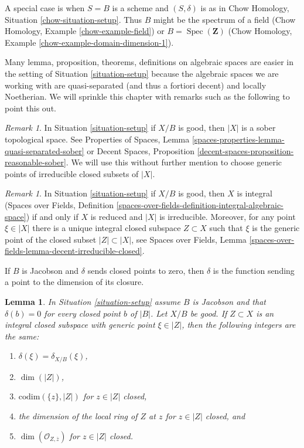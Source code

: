 \documentclass{stacks-project}
\theoremstyle{plain}
\newtheorem{lemma}[subsection]{Lemma}
\theoremstyle{definition}
\theoremstyle{remark}
\newtheorem{remark}[subsection]{Remark}
\numberwithin{equation}{subsection}
\def\Spec{\mathop{\mathrm{Spec}}}
\begin{document}
\noindent
A special case is when $S = B$ is a scheme and $(S, \delta)$ is as in
Chow Homology, Situation \ref{chow-situation-setup}. Thus $B$ might be
the spectrum of a field (Chow Homology, Example \ref{chow-example-field})
or $B = \Spec(\mathbf{Z})$
(Chow Homology, Example \ref{chow-example-domain-dimension-1}).

\medskip\noindent
Many lemma, proposition, theorems, definitions on algebraic spaces
are easier in the setting of Situation \ref{situation-setup} because
the algebraic spaces we are working with are quasi-separated
(and thus a fortiori decent) and locally Noetherian. We will sprinkle
this chapter with remarks such as the following to point this out.

\begin{remark}
\label{remark-sober}
In Situation \ref{situation-setup} if $X/B$ is good, then
$|X|$ is a sober topological space. See
Properties of Spaces, Lemma \ref{spaces-properties-lemma-quasi-separated-sober}
or Decent Spaces, Proposition \ref{decent-spaces-proposition-reasonable-sober}.
We will use this without further mention
to choose generic points of irreducible closed subsets of $|X|$.
\end{remark}

\begin{remark}
\label{remark-integral}
In Situation \ref{situation-setup} if $X/B$ is good, then
$X$ is integral (Spaces over Fields, Definition
\ref{spaces-over-fields-definition-integral-algebraic-space})
if and only if $X$ is reduced and $|X|$ is irreducible.
Moreover, for any point $\xi \in |X|$ there is a unique integral closed
subspace $Z \subset X$ such that $\xi$ is the generic point
of the closed subset $|Z| \subset |X|$, see
Spaces over Fields, Lemma
\ref{spaces-over-fields-lemma-decent-irreducible-closed}.
\end{remark}

\noindent
If $B$ is Jacobson and $\delta$ sends closed points to zero, then $\delta$
is the function sending a point to the dimension of its closure.

\begin{lemma}
\label{lemma-delta-is-dimension}
In Situation \ref{situation-setup} assume $B$ is Jacobson
and that $\delta(b) = 0$ for every closed point $b$ of $|B|$.
Let $X/B$ be good. If $Z \subset X$ is an integral closed subspace
with generic point $\xi \in |Z|$, then the following integers are the same:
\begin{enumerate}
\item $\delta(\xi) = \delta_{X/B}(\xi)$,
\item $\dim(|Z|)$,
\item $\text{codim}(\{z\}, |Z|)$ for $z \in |Z|$ closed,
\item the dimension of the local ring of $Z$ at $z$ for
$z \in |Z|$ closed, and
\item $\dim(\mathcal{O}_{Z, \overline{z}})$ for $z \in |Z|$ closed.
\end{enumerate}
\end{lemma}
\end{document}
